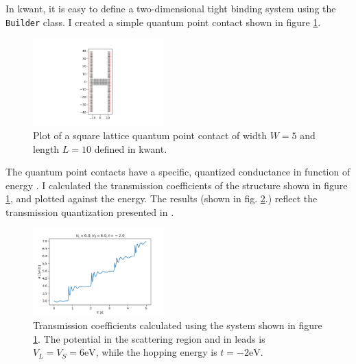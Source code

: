 \documentclass[11pt, a4paper, twocolumn]{article}
\begin{document}
In kwant, it is easy to define a two-dimensional tight binding system using the \texttt{Builder} class.
I created a simple quantum point contact shown in figure \ref{fig:2degconst_W5_L10}.
\begin{figure}[H]
  \begin{center}
  \includegraphics[width=0.45\textwidth]{./media/2degconst_W5_L10.png}
  \caption{Plot of a square lattice quantum point contact of width $W=5$ and
  length $L=10$ defined in kwant.}
  \label{fig:2degconst_W5_L10}
  \end{center}
\end{figure}

The quantum point contacts have a specific, quantized conductance in function of energy \cite{QPCarticle}.
I calculated the transmission coefficients of the structure shown in figure \ref{fig:2degconst_W5_L10},
and plotted against the energy. The results (shown in fig. \ref{fig:cond_2deg_W5_L10_VL6_0_VS6_0.png}.)
reflect the transmission quantization presented in \cite{QPCarticle}.
\begin{figure}[H]
  \begin{center}
  \includegraphics[width=0.45\textwidth]{./media/cond_2deg_W5_L10_VL6_0_VS6_0.png}
  \caption{Transmission coefficients calculated using the system shown in figure \ref{fig:2degconst_W5_L10}.
  The potential in the scattering region and in leads is $V_L=V_S=6\textrm{eV}$, while the
  hopping energy is $t=-2\textrm{eV}$.}
  \label{fig:cond_2deg_W5_L10_VL6_0_VS6_0.png}
  \end{center}
\end{figure}
\end{document}
